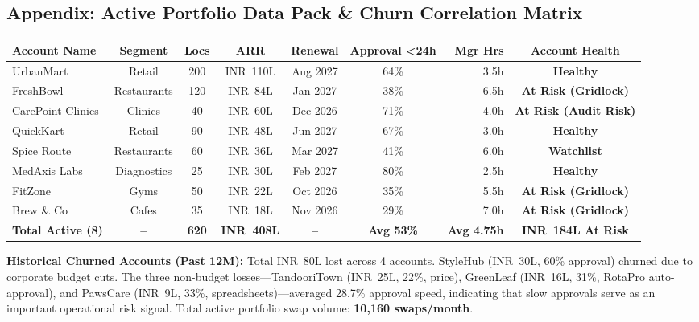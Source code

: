 \documentclass[10pt,a4paper]{article}
\newcommand{\INR}{INR~}
\begin{document}
\vspace{-2.5mm}
\subsection*{Appendix: Active Portfolio Data Pack \& Churn Correlation Matrix}

\begin{table}[h!]
\centering
\footnotesize
\renewcommand{\arraystretch}{1.05}
\begin{tabular*}{\textwidth}{@{\extracolsep{\fill}}lcccccrc@{}}
\toprule
\textbf{Account Name} & \textbf{Segment} & \textbf{Locs} & \textbf{ARR} & \textbf{Renewal} & \textbf{Approval <24h} & \textbf{Mgr Hrs} & \textbf{Account Health} \\
\midrule
UrbanMart & Retail & 200 & \INR 110L & Aug 2027 & 64\% & 3.5h & \textcolor{HealthyGreen}{\textbf{Healthy}} \\
FreshBowl & Restaurants & 120 & \INR 84L & Jan 2027 & 38\% & 6.5h & \textcolor{RiskRed}{\textbf{At Risk (Gridlock)}} \\
CarePoint Clinics & Clinics & 40 & \INR 60L & Dec 2026 & 71\% & 4.0h & \textcolor{RiskRed}{\textbf{At Risk (Audit Risk)}} \\
QuickKart & Retail & 90 & \INR 48L & Jun 2027 & 67\% & 3.0h & \textcolor{HealthyGreen}{\textbf{Healthy}} \\
Spice Route & Restaurants & 60 & \INR 36L & Mar 2027 & 41\% & 6.0h & \textcolor{WatchOrange}{\textbf{Watchlist}} \\
MedAxis Labs & Diagnostics & 25 & \INR 30L & Feb 2027 & 80\% & 2.5h & \textcolor{HealthyGreen}{\textbf{Healthy}} \\
FitZone & Gyms & 50 & \INR 22L & Oct 2026 & 35\% & 5.5h & \textcolor{RiskRed}{\textbf{At Risk (Gridlock)}} \\
Brew \& Co & Cafes & 35 & \INR 18L & Nov 2026 & 29\% & 7.0h & \textcolor{RiskRed}{\textbf{At Risk (Gridlock)}} \\
\midrule
\textbf{Total Active (8)} & \textbf{--} & \textbf{620} & \textbf{\INR 408L} & \textbf{--} & \textbf{Avg 53\%} & \textbf{Avg 4.75h} & \textcolor{RiskRed}{\textbf{\INR 184L At Risk}} \\
\bottomrule
\end{tabular*}
\end{table}
\vspace{-3mm}
\noindent
{\scriptsize\textbf{Historical Churned Accounts (Past 12M):} Total \INR 80L lost across 4 accounts. StyleHub (\INR 30L, 60\% approval) churned due to corporate budget cuts. The three non-budget losses—TandooriTown (\INR 25L, 22\%, price), GreenLeaf (\INR 16L, 31\%, RotaPro auto-approval), and PawsCare (\INR 9L, 33\%, spreadsheets)—averaged 28.7\% approval speed, indicating that slow approvals serve as an important operational risk signal. Total active portfolio swap volume: \textbf{10,160 swaps/month}.}
\end{document}
